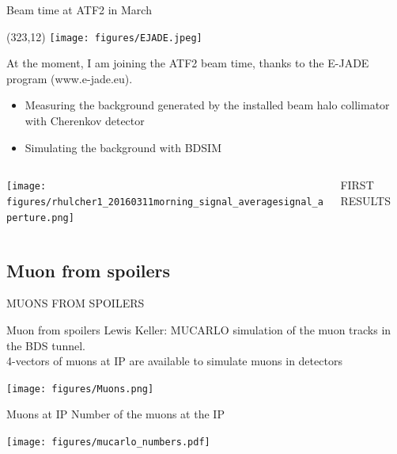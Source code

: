 \documentclass[xcolor={dvipsnames}]{beamer}
\newcommand{\ejadelogo}{
  \setlength{\TPHorizModule}{1pt}
  \setlength{\TPVertModule}{1pt}
  \begin{textblock}{1}(323,12)
   \texttt{[image: figures/EJADE.jpeg]}
  \end{textblock}
}
\begin{document}
\begin{frame}{Beam time at ATF2 in March}
\ejadelogo
At the moment, I am joining the ATF2 beam time, thanks to the E-JADE program {\tiny(www.e-jade.eu)}.
\begin{itemize}
\item Measuring the background generated by the installed beam halo collimator with Cherenkov detector
\item Simulating the background with BDSIM
\end{itemize}
\begin{columns}[T]
 \begin{column}[t]{0.75\textwidth}
 \flushright
  \texttt{[image: figures/rhulcher1\_20160311morning\_signal\_averagesignal\_aperture.png]}
 \end{column}
 \begin{column}[t]{0.25\textwidth}
  \flushleft
  \textcolor{RubineRed}{FIRST RESULTS}
 \end{column}
\end{columns}
\end{frame}

\subsection{Muon from spoilers}
\begin{frame}
 \begin{center}
  \alert{\MakeUppercase{Muons from spoilers}}
 \end{center}
\end{frame}

\begin{frame}{Muon from spoilers}
 Lewis Keller: MUCARLO simulation of the muon tracks in the BDS tunnel.\\
 4-vectors of muons at IP are available to simulate muons in detectors
 \begin{center}
 	\texttt{[image: figures/Muons.png]}
  \end{center}
\end{frame}

\begin{frame}{Muons at IP}
Number of the muons at the IP
  \begin{center}
 	\texttt{[image: figures/mucarlo\_numbers.pdf]}
  \end{center}
\end{frame}
\end{document}
